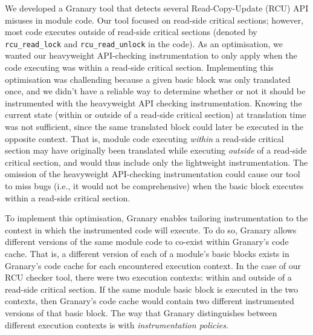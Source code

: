 \documentclass[preprint]{sigplanconf}
\begin{document}
We developed a Granary tool that detects several Read-Copy-Update (RCU) API misuses in module code. Our tool focused on read-side critical sections; however, most code executes outside of read-side critical sections (denoted by \texttt{rcu\_read\_lock} and \texttt{rcu\_read\_unlock} in the code). As an optimisation, we wanted our heavyweight API-checking instrumentation to only apply when the code executing was within a read-side critical section. Implementing this optimisation was challending because a given basic block was only translated once, and we didn't have a reliable way to determine whether or not it should be instrumented with the heavyweight API checking instrumentation. Knowing the current state (within or outside of a read-side critical section) at translation time was not sufficient, since the same translated block could later be executed in the opposite context. That is, module code executing \emph{within} a read-side critical section may have originally been translated while executing \emph{outside} of a read-side critical section, and would thus include only the lightweight instrumentation. The omission of the heavyweight API-checking instrumentation could cause our tool to miss bugs (i.e., it would not be comprehensive) when the basic block executes within a read-side critical section.


To implement this optimisation, Granary enables tailoring instrumentation to the context in which the instrumented code will execute. To do so, Granary allows different versions of the same module code to co-exist within Granary's code cache. That is, a different version of each of a module's basic blocks exists in Granary's code cache  for each encountered execution context. In the case of our RCU checker tool, there were two execution contexts: within and outside of a read-side critical section. If the same module basic block is  executed in the two contexts, then Granary's code cache would contain two different instrumented versions of that basic block. The way that Granary distinguishes between different execution contexts is with \emph{instrumentation policies}. 
\end{document}
